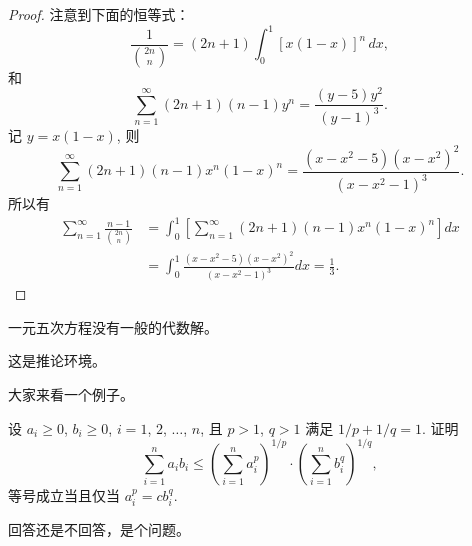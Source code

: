 \begin{proof}
注意到下面的恒等式：
\[
\frac{1}{\binom{2n}{n}}=(2n+1)\int_0^1[x(1-x)]^n\,dx,
\]
和
\[
\sum_{n=1}^{\infty}(2n+1)(n-1)y^n=\frac{(y-5)y^2}{(y-1)^3}.
\]
记 $y=x(1-x)$, 则
\[
\sum_{n=1}^{\infty}(2n+1)(n-1)x^n(1-x)^n=\frac{(x-x^2-5)(x-x^2)^2}{(x-x^2-1)^3}.
\]
所以有
\begin{align*}
\sum_{n=1}^{\infty}\frac{n-1}{\binom{2n}{n}} & =
\int_0^1\left[\sum_{n=1}^{\infty}(2n+1)(n-1)x^n(1-x)^n\right]dx\\
& =\int_0^1\frac{(x-x^2-5)(x-x^2)^2}{(x-x^2-1)^3}dx=\frac13.
\end{align*}
\end{proof}

\begin{theorem}\label{the:theorem1}
一元五次方程没有一般的代数解。
\end{theorem}

\begin{corollary}
这是推论环境。
\end{corollary}

\begin{example}
大家来看一个例子。
\end{example}

\begin{exercise}
设 $a_i\geq0$, $b_i\geq0$, $i=1$, $2$, $\ldots$, $n$, 
且 $p>1$, $q>1$ 满足 $1/p+1/q=1$. 证明
\[
\sum_{i=1}^{n}a_ib_i\leq\left(\sum_{i=1}^{n}a_i^p\right)^{1/p}
\cdot\left(\sum_{i=1}^{n}b_i^q\right)^{1/q},
\]
等号成立当且仅当 $a_i^p=cb_i^q$.
\end{exercise}

\begin{problem}
回答还是不回答，是个问题。
\end{problem}